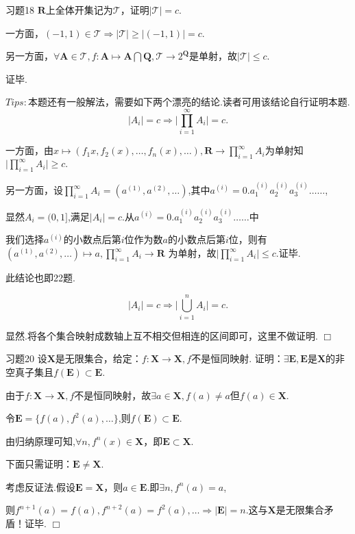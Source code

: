 \documentclass[11pt, a4paper, twoside]{ctexbook}
\newenvironment{proof2}{{\noindent\heiti 证明}}{\hfill $\Box $\par}
\begin{document}
	\begin{myproposition}{习题18}{}
		$\mathbf{R}$上全体开集记为$\mathcal{T} $，证明$\mid \mathcal{T}\mid=c$.    
	\end{myproposition}
	\begin{proof2}
		一方面，$(-1,1)\in \mathcal{T}\Rightarrow \mid \mathcal{T}\mid \geq \mid (-1,1) \mid = c$.
		
		
		另一方面，$\forall \mathbf{A} \in \mathcal{T},f:\mathbf{A} \mapsto \mathbf{A}\bigcap \mathbf{Q},\mathcal{T}\to 2^{\mathbf{Q}}$是单射，故$\mid \mathcal{T}\mid\leq c$.
		
		
		证毕.
		
		
		$Tips:$本题还有一般解法，需要如下两个漂亮的结论.读者可用该结论自行证明本题.
		$$\mid A_{i}\mid =c \Rightarrow \mid \displaystyle\prod _{i=1}^{\infty}A_{i}\mid =c.$$
		
		
		一方面，由$x\mapsto (f_1{x},f_{2}(x),…,f_{n}(x),…),\mathbf{R}\to \displaystyle\prod _{i=1}^{\infty}A_{i}$为单射知$\mid \displaystyle\prod _{i=1}^{\infty}A_{i}\mid \geq c.$
		
		
		另一方面，设$\displaystyle\prod _{i=1}^{\infty}A_{i}=(a^{(1)},a^{(2)},…)$,其中$a^{(i)}=0.a_{1}^{(i)}a_{2}^{(i)}a_{3}^{(i)}……$,
		
		
		显然$A_{i}=(0,1]$,满足$\mid A_{i}\mid =c$.从$a^{(i)}=0.a_{1}^{(i)}a_{2}^{(i)}a_{3}^{(i)}……$中
		
		
		我们选择$a^{(i)}$的小数点后第$i$位作为数$a$的小数点后第$i$位，则有$(a^{(1)},a^{(2)},…)\mapsto a,\displaystyle\prod _{i=1}^{\infty}A_{i}\to \mathbf{R}$
		为单射，故$\mid \displaystyle\prod _{i=1}^{\infty}A_{i}\mid \leq c.$证毕.
		
		
		此结论也即22题.
		
		
		$$\mid A_{i}\mid =c \Rightarrow \mid \displaystyle\bigcup _{i=1}^{n}A_{i}\mid =c.$$
		
		
		显然.将各个集合映射成数轴上互不相交但相连的区间即可，这里不做证明.
	\end{proof2}

	\begin{myproposition}{习题20}{}
		设$\mathbf{X}$是无限集合，给定：$f:\mathbf{X}\to \mathbf{X},f$不是恒同映射.
		证明：$\exists \mathbf{E},\mathbf{E}$是$\mathbf{X}$的非空真子集且$f(\mathbf{E})\subset \mathbf{E}$.    
	\end{myproposition}
	\begin{proof2}
		由于$f:\mathbf{X}\to \mathbf{X},f$不是恒同映射，故$\exists a \in \mathbf{X},f(a)\neq a$但$f(a)\in \mathbf{X}$.


		令$\mathbf{E}=\{f(a),f^{2}(a),…\}$,则$f(\mathbf{E})\subset\mathbf{E}.$


		由归纳原理可知,$\forall n,f^{n}(x)\in \mathbf{X}$，即$\mathbf{E}\subset \mathbf{X}$.


		下面只需证明：$\mathbf{E}\neq \mathbf{X}$.


		考虑反证法.假设$\mathbf{E}= \mathbf{X}$，则$a\in \mathbf{E}$.即$\exists n,f^{n}(a)=a$,


		则$f^{n+1}(a)=f(a),f^{n+2}(a)=f^{2}(a),…\Rightarrow\mid \mathbf{E}\mid=n$.这与$\mathbf{X}$是无限集合矛盾！证毕.
	\end{proof2}
\end{document}
